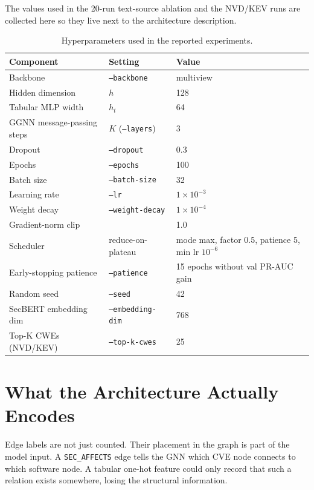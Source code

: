 \documentclass[11pt]{article}
\begin{document}
The values used in the 20-run text-source ablation and the NVD/KEV
runs are collected here so they live next to the architecture
description.

\begin{table}[h]
\centering
\small
\begin{tabular}{lll}
\toprule
Component & Setting & Value \\
\midrule
Backbone                   & \texttt{--backbone}        & multiview \\
Hidden dimension           & $h$                        & 128 \\
Tabular MLP width          & $h_t$                      & 64 \\
GGNN message-passing steps & $K$ (\texttt{--layers})    & 3 \\
Dropout                    & \texttt{--dropout}         & 0.3 \\
Epochs                     & \texttt{--epochs}          & 100 \\
Batch size                 & \texttt{--batch-size}      & 32 \\
Learning rate              & \texttt{--lr}              & $1 \times 10^{-3}$ \\
Weight decay               & \texttt{--weight-decay}    & $1 \times 10^{-4}$ \\
Gradient-norm clip         &                            & 1.0 \\
Scheduler                  & reduce-on-plateau          & mode max, factor 0.5, patience 5, min lr $10^{-6}$ \\
Early-stopping patience    & \texttt{--patience}        & 15 epochs without val PR-AUC gain \\
Random seed                & \texttt{--seed}            & 42 \\
SecBERT embedding dim      & \texttt{--embedding-dim}   & 768 \\
Top-K CWEs (NVD/KEV)       & \texttt{--top-k-cwes}      & 25 \\
\bottomrule
\end{tabular}
\caption{Hyperparameters used in the reported experiments.}
\end{table}

\section{What the Architecture Actually Encodes}

Edge labels are not just counted. Their placement in the graph is part
of the model input. A \texttt{SEC\_AFFECTS} edge tells the GNN which
CVE node connects to which software node. A tabular one-hot feature
could only record that such a relation exists somewhere, losing the
structural information.
\end{document}
